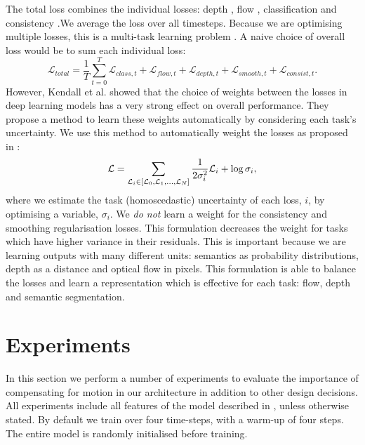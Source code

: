 The total loss combines the individual losses: depth , flow , classification and consistency .We average the loss over all timesteps. Because we are optimising multiple losses, this is a multi-task learning problem \citep{caruana1998multitask}. A naive choice of overall loss would be to sum each individual loss:
\begin{equation}
\mathcal{L}_{total} =\frac{1}{T} \sum_{t=0}^T  \mathcal{L}_{class,t} +\mathcal{L}_{flow,t} +\mathcal{L}_{depth,t} +\mathcal{L}_{smooth,t} +\mathcal{L}_{consist,t} .
\end{equation}
However, Kendall et al. \citep{kendall2017multi} showed that the choice of weights between the losses in deep learning models has a very strong effect on overall performance. They propose a method to learn these weights automatically by considering each task's uncertainty. We use this method to automatically weight the losses as proposed in \citep{kendall2017multi}:
\begin{equation}
\vspace{-1mm}
\mathcal{L} = \sum_{\mathcal{L}_i \in [\mathcal{L}_{0}, \mathcal{L}_{1}, ..., \mathcal{L}_{N}]} \frac{1}{2 \sigma_i^2} \mathcal{L}_i + \log \sigma_i,
\label{eqn:multitask}
\vspace{-1mm}
\end{equation}
where we estimate the task (homoscedastic) uncertainty of each loss, $i$, by optimising a variable, $\sigma_i$. We \textit{do not} learn a weight for the consistency and smoothing regularisation losses. This formulation decreases the weight for tasks which have higher variance in their residuals. This is important because we are learning outputs with many different units: semantics as probability distributions, depth as a distance and optical flow in pixels. This formulation is able to balance the losses and learn a representation which is effective for each task: flow, depth and semantic segmentation.



\section{Experiments}

In this section we perform a number of experiments to evaluate the importance of compensating for motion in our architecture in addition to other design decisions. All experiments include all features of the model described in , unless otherwise stated. By default we train over four time-steps, with a warm-up of four steps. The entire model is randomly initialised before training.

